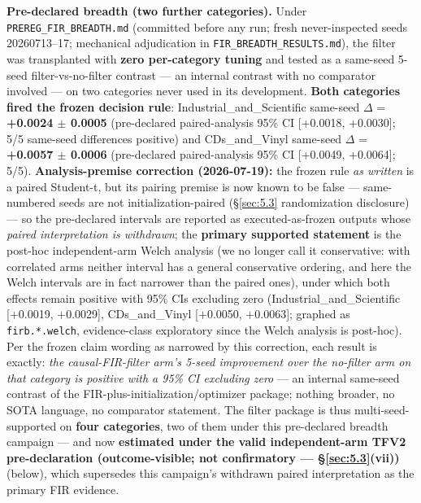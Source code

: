 \textbf{Pre-declared breadth (two further categories).} Under \texttt{PREREG\_FIR\_BREADTH.md} (committed before any run; fresh never-inspected seeds 20260713--17; mechanical adjudication in \texttt{FIR\_BREADTH\_RESULTS.md}), the filter was transplanted with \textbf{zero per-category tuning} and tested as a same-seed 5-seed filter-vs-no-filter contrast --- an internal contrast with no comparator involved --- on two categories never used in its development. \textbf{Both categories fired the frozen decision rule}: Industrial\_and\_Scientific same-seed \ensuremath{\Delta} = \textbf{+0.0024 \ensuremath{\pm} 0.0005} (pre-declared paired-analysis 95\% CI {[}+0.0018, +0.0030{]}; 5/5 same-seed differences positive) and CDs\_and\_Vinyl same-seed \ensuremath{\Delta} = \textbf{+0.0057 \ensuremath{\pm} 0.0006} (pre-declared paired-analysis 95\% CI {[}+0.0049, +0.0064{]}; 5/5). \textbf{Analysis-premise correction (2026-07-19):} the frozen rule \emph{as written} is a paired Student-t, but its pairing premise is now known to be false --- same-numbered seeds are not initialization-paired (\S\ref{sec:5.3} randomization disclosure) --- so the pre-declared intervals are reported as executed-as-frozen outputs whose \emph{paired interpretation is withdrawn}; the \textbf{primary supported statement} is the post-hoc independent-arm Welch analysis (we no longer call it conservative: with correlated arms neither interval has a general conservative ordering, and here the Welch intervals are in fact narrower than the paired ones), under which both effects remain positive with 95\% CIs excluding zero (Industrial\_and\_Scientific {[}+0.0019, +0.0029{]}, CDs\_and\_Vinyl {[}+0.0050, +0.0063{]}; graphed as \texttt{firb.*.welch}, evidence-class exploratory since the Welch analysis is post-hoc). Per the frozen claim wording as narrowed by this correction, each result is exactly: \emph{the causal-FIR-filter arm's 5-seed improvement over the no-filter arm on that category is positive with a 95\% CI excluding zero} --- an internal same-seed contrast of the FIR-plus-initialization/optimizer package; nothing broader, no SOTA language, no comparator statement. The filter package is thus multi-seed-supported on \textbf{four categories}, two of them under this pre-declared breadth campaign --- and now \textbf{estimated under the valid independent-arm TFV2 pre-declaration (outcome-visible; not confirmatory --- \S\ref{sec:5.3}(vii))} (below), which supersedes this campaign's withdrawn paired interpretation as the primary FIR evidence.

